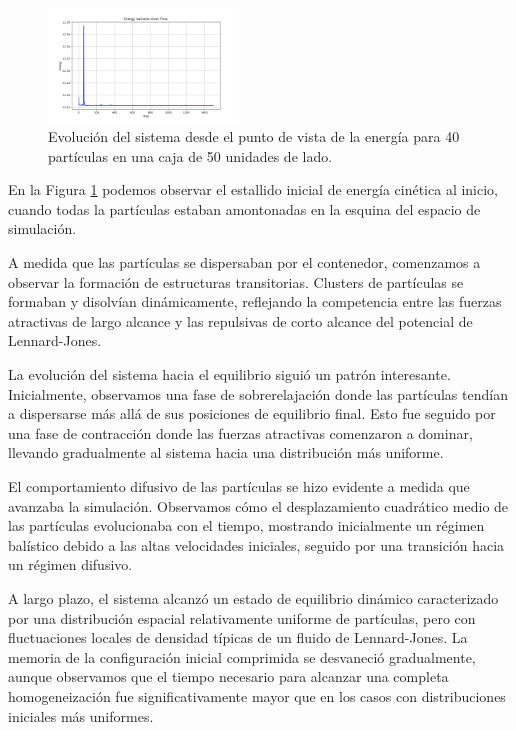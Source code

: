 \documentclass[twocolumn]{article}
\begin{document}
\begin{figure}[]
    \centering
    \includegraphics[width=0.45\textwidth]{figures/variacion_energia_40p_10ki_01.png}
    \caption{Evolución del sistema desde el punto de vista de la energía para 40 partículas en una caja de 50 unidades de lado.}
    \label{fig:case3energia}
\end{figure}

En la Figura \ref{fig:case3energia} podemos observar el estallido inicial de energía cinética al inicio, cuando todas la partículas estaban amontonadas en la esquina del espacio de simulación.

A medida que las partículas se dispersaban por el contenedor, comenzamos a observar la formación de estructuras transitorias. Clusters de partículas se formaban y disolvían dinámicamente, reflejando la competencia entre las fuerzas atractivas de largo alcance y las repulsivas de corto alcance del potencial de Lennard-Jones.

La evolución del sistema hacia el equilibrio siguió un patrón interesante. Inicialmente, observamos una fase de sobrerelajación donde las partículas tendían a dispersarse más allá de sus posiciones de equilibrio final. Esto fue seguido por una fase de contracción donde las fuerzas atractivas comenzaron a dominar, llevando gradualmente al sistema hacia una distribución más uniforme.

El comportamiento difusivo de las partículas se hizo evidente a medida que avanzaba la simulación. Observamos cómo el desplazamiento cuadrático medio de las partículas evolucionaba con el tiempo, mostrando inicialmente un régimen balístico debido a las altas velocidades iniciales, seguido por una transición hacia un régimen difusivo.

A largo plazo, el sistema alcanzó un estado de equilibrio dinámico caracterizado por una distribución espacial relativamente uniforme de partículas, pero con fluctuaciones locales de densidad típicas de un fluido de Lennard-Jones. La memoria de la configuración inicial comprimida se desvaneció gradualmente, aunque observamos que el tiempo necesario para alcanzar una completa homogeneización fue significativamente mayor que en los casos con distribuciones iniciales más uniformes.
\end{document}
